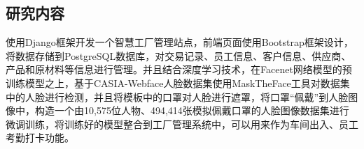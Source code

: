 \subsection{研究内容}

使用Django框架开发一个智慧工厂管理站点，前端页面使用Bootstrap框架设计，将数据存储到PostgreSQL数据库，对交易记录、员工信息、客户信息、供应商、产品和原材料等信息进行管理。并且结合深度学习技术，在Facenet网络模型的预训练模型之上，基于CASIA-Webface人脸数据集使用MaskTheFace工具对数据集中的人脸进行检测，并且将模板中的口罩对人脸进行遮罩，将口罩“佩戴”到人脸图像中，构造一个由10,575位人物、494,414张模拟佩戴口罩的人脸图像数据集进行微调训练，将训练好的模型整合到工厂管理系统中，可以用来作为车间出入、员工考勤打卡功能。